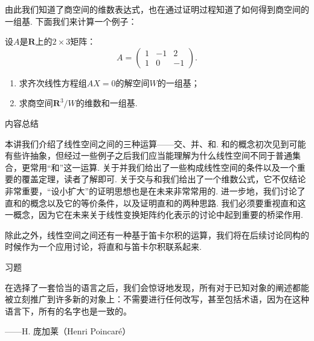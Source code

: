 由此我们知道了商空间的维数表达式，也在通过证明过程知道了如何得到商空间的一组基. 下面我们来计算一个例子：

\begin{example}{}{}
    设$A$是$\mathbf{R}$上的$2\times 3$矩阵：
    \[A=\begin{pmatrix}
            1 & -1 & 2 \\ 1 & 0 & -1
        \end{pmatrix}.\]
    \begin{enumerate}
        \item 求齐次线性方程组$AX=0$的解空间$W$的一组基；

        \item 求商空间$\mathbf{R}^3/W$的维数和一组基.
    \end{enumerate}
\end{example}

\begin{solution}

\end{solution}

\vspace{2ex}
\centerline{\heiti \Large 内容总结}

本讲我们介绍了线性空间之间的三种运算——交、并、和. 和的概念初次见到可能有些许抽象，但经过一些例子之后我们应当能理解为什么线性空间不同于普通集合，更常用``和''这一运算. 关于并我们给出了一些构成线性空间的条件以及一个重要的覆盖定理，读者了解即可. 关于交与和我们给出了一个维数公式，它不仅结论非常重要，``设小扩大''的证明思想也是在未来非常常用的. 进一步地，我们讨论了直和的概念以及它的等价条件，以及证明直和的两种思路. 我们必须要重视直和这一概念，因为它在未来关于线性变换矩阵约化表示的讨论中起到重要的桥梁作用.

除此之外，线性空间之间还有一种基于笛卡尔积的运算，我们将在后续讨论同构的时候作为一个应用讨论，将直和与笛卡尔积联系起来.

\vspace{2ex}
\centerline{\heiti \Large 习题}

\vspace{2ex}
{\kaishu 在选择了一套恰当的语言之后，我们会惊讶地发现，所有对于已知对象的阐述都能被立刻推广到许多新的对象上：不需要进行任何改写，甚至包括术语，因为在这种语言下，所有的名字也是一致的。}
\begin{flushright}
    \kaishu
    ——H. 庞加莱（Henri Poincaré）
\end{flushright}

